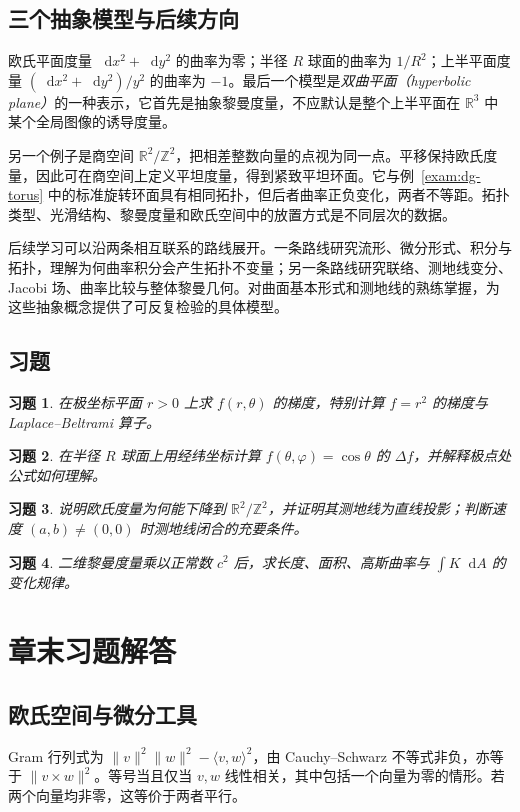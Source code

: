 \documentclass[UTF8,12pt,a4paper,fontset=fandol]{ctexbook}
\newcommand{\R}{\mathbb R}
\newcommand{\dd}{\mathop{}\!\mathrm d}
\newcommand{\ip}[2]{\langle #1,#2\rangle}
\newcommand{\norm}[1]{\lVert #1\rVert}
\newtheorem{exercise}{习题}[chapter]
\begin{document}
\section{三个抽象模型与后续方向}
欧氏平面度量 $\dd x^2+\dd y^2$ 的曲率为零；半径 $R$ 球面的曲率为 $1/R^2$；上半平面度量 $(\dd x^2+\dd y^2)/y^2$ 的曲率为 $-1$。最后一个模型是\emph{双曲平面（hyperbolic plane）}的一种表示，它首先是抽象黎曼度量，不应默认是整个上半平面在 $\R^3$ 中某个全局图像的诱导度量。

另一个例子是商空间 $\R^2/\mathbb Z^2$，把相差整数向量的点视为同一点。平移保持欧氏度量，因此可在商空间上定义平坦度量，得到紧致平坦环面。它与例~\ref{exam:dg-torus} 中的标准旋转环面具有相同拓扑，但后者曲率正负变化，两者不等距。拓扑类型、光滑结构、黎曼度量和欧氏空间中的放置方式是不同层次的数据。

后续学习可以沿两条相互联系的路线展开。一条路线研究流形、微分形式、积分与拓扑，理解为何曲率积分会产生拓扑不变量；另一条路线研究联络、测地线变分、Jacobi 场、曲率比较与整体黎曼几何。对曲面基本形式和测地线的熟练掌握，为这些抽象概念提供了可反复检验的具体模型。

\section{习题}
\begin{exercise}\label{ex:dg-manifolds-gradient}
在极坐标平面 $r>0$ 上求 $f(r,\theta)$ 的梯度，特别计算 $f=r^2$ 的梯度与 Laplace--Beltrami 算子。
\end{exercise}
\begin{exercise}\label{ex:dg-manifolds-sphere-laplace}
在半径 $R$ 球面上用经纬坐标计算 $f(\theta,\varphi)=\cos\theta$ 的 $\Delta f$，并解释极点处公式如何理解。
\end{exercise}
\begin{exercise}\label{ex:dg-manifolds-flat-torus}
说明欧氏度量为何能下降到 $\R^2/\mathbb Z^2$，并证明其测地线为直线投影；判断速度 $(a,b)\ne(0,0)$ 时测地线闭合的充要条件。
\end{exercise}
\begin{exercise}\label{ex:dg-manifolds-scale}
二维黎曼度量乘以正常数 $c^2$ 后，求长度、面积、高斯曲率与 $\int K\dd A$ 的变化规律。
\end{exercise}

\appendix
\chapter{章末习题解答}
\label{app:dg-solutions}

\section{欧氏空间与微分工具}
\begin{solve}
Gram 行列式为 $\norm v^2\norm w^2-\ip vw^2$，由 Cauchy--Schwarz 不等式非负，亦等于 $\norm{v\times w}^2$。等号当且仅当 $v,w$ 线性相关，其中包括一个向量为零的情形。若两个向量均非零，这等价于两者平行。
\end{solve}
\end{document}

